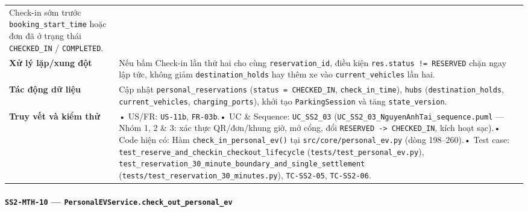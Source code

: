 \documentclass[11pt,a4paper]{article}
\begin{document}
\begin{longtable}[]{@{}
  >{\raggedright\arraybackslash}p{}
  >{\raggedright\arraybackslash}p{}@{}}
Check-in sớm trước \texttt{booking\_start\_time} hoặc đơn đã ở trạng
thái \texttt{CHECKED\_IN} / \texttt{COMPLETED}. \\
\textbf{Xử lý lặp/xung đột} & Nếu bấm Check-in lần thứ hai cho cùng
\texttt{reservation\_id}, điều kiện \texttt{res.status\ !=\ RESERVED}
chặn ngay lập tức, không giảm \texttt{destination\_holds} hay thêm xe
vào \texttt{current\_vehicles} lần hai. \\
\textbf{Tác động dữ liệu} & Cập nhật \texttt{personal\_reservations}
(\texttt{status\ =\ CHECKED\_IN}, \texttt{check\_in\_time}),
\texttt{hubs} (\texttt{destination\_holds}, \texttt{current\_vehicles},
\texttt{charging\_ports}), khởi tạo \texttt{ParkingSession} và tăng
\texttt{state\_version}. \\
\textbf{Truy vết và kiểm thử} & • US/FR: \texttt{US-11b},
\texttt{FR-03b}.• UC \& Sequence: \texttt{UC\_SS2\_03}
(\texttt{UC\_SS2\_03\_NguyenAnhTai\_sequence.puml} --- Nhóm 1, 2 \& 3:
xác thực QR/đơn/khung giờ, mở cổng, đổi
\texttt{RESERVED\ -\textgreater{}\ CHECKED\_IN}, kích hoạt sạc).• Code
hiện có: Hàm \texttt{check\_in\_personal\_ev()} tại
\texttt{src/core/personal\_ev.py} (dòng 198--260).• Test case:
\texttt{test\_reserve\_and\_checkin\_checkout\_lifecycle}
(\texttt{tests/test\_personal\_ev.py}),
\texttt{test\_reservation\_30\_minute\_boundary\_and\_single\_settlement}
(\texttt{tests/test\_reservation\_30\_minutes.py}), \texttt{TC-SS2-05},
\texttt{TC-SS2-06}. \\
\end{longtable}

\hypertarget{ss2-mth-10-personalevservice.check_out_personal_ev}{%
\paragraph{\texorpdfstring{\texttt{SS2-MTH-10} ---
\texttt{PersonalEVService.check\_out\_personal\_ev}}{SS2-MTH-10 --- PersonalEVService.check\_out\_personal\_ev}}\label{ss2-mth-10-personalevservice.check_out_personal_ev}}
\end{document}
